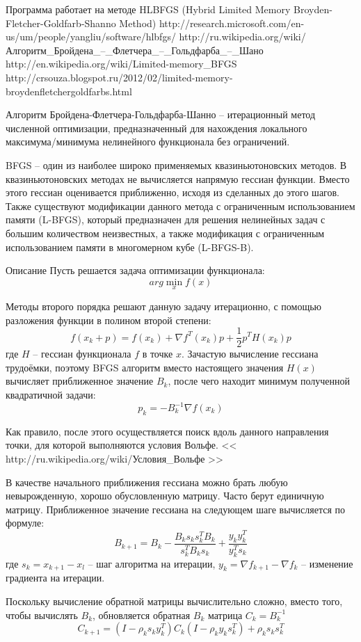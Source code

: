 Программа работает на методе HLBFGS 
(Hybrid Limited Memory Broyden-Fletcher-Goldfarb-Shanno Method)
http://research.microsoft.com/en-us/um/people/yangliu/software/hlbfgs/
http://ru.wikipedia.org/wiki/Алгоритм_Бройдена_--_Флетчера_--_Гольдфарба_--_Шано
http://en.wikipedia.org/wiki/Limited-memory_BFGS
http://crsouza.blogspot.ru/2012/02/limited-memory-broydenfletchergoldfarbs.html

Алгоритм Бройдена-Флетчера-Гольдфарба-Шанно -- итерационный метод численной 
оптимизации, предназначенный для нахождения локального максимума/минимума 
нелинейного функционала без ограничений. 

BFGS -- один из наиболее широко применяемых квазиньютоновских методов. В 
квазиньютоновских методах не вычисляется напрямую гессиан функции. Вместо этого 
гессиан оценивается приближенно, исходя из сделанных до этого шагов. Также 
существуют модификации данного метода с ограниченным использованием памяти 
(L-BFGS), который предназначен для решения нелинейных задач с большим 
количеством неизвестных, а также модификация с ограниченным использованием 
памяти в многомерном кубе (L-BFGS-B).

Описание
Пусть решается задача оптимизации функционала:
\[
    arg \min\limits_{x} f(x)
\]

Методы второго порядка решают данную задачу итерационно, с помощью разложения 
функции в полином второй степени:
\[
    f(x_k+p) = f(x_k) + \nabla f^{T}(x_k)p + \frac{1}{2}p^{T}H(x_k)p
\]
где \( H \) -- гессиан функционала \( f \) в точке \( x \). Зачастую вычисление 
гессиана трудоёмки, поэтому BFGS алгоритм вместо настоящего значения 
\( H(x) \) вычисляет приближенное значение \( B_k \), после чего находит 
минимум полученной квадратичной задачи:
\[
    p_k = -B_{k}^{-1}\nabla f(x_k)
\]

Как правило, после этого осуществляется поиск вдоль данного направления точки, 
для которой выполняются условия Вольфе.
<< http://ru.wikipedia.org/wiki/Условия_Вольфе >>

В качестве начального приближения гессиана можно брать любую невырожденную, 
хорошо обусловленную матрицу. Часто берут единичную матрицу. Приближенное 
значение гессиана на следующем шаге вычисляется по формуле:
\[
    B_{k+1} = B_k - \frac{B_k s_k s_{k}^{T} B_k}{s_{k}^{T} B_k s_k} + 
        \frac{y_k y_{k}^{T}}{y_{k}^{T} s_k}
\]
где \( s_k = x_{k+1} - x_l \) -- шаг алгоритма на итерации, 
\( y_k = \nabla f_{k+1} - \nabla f_k \) -- изменение градиента на итерации.

Поскольку вычисление обратной матрицы вычислительно сложно, вместо того, чтобы 
вычислять \( B_k \), обновляется обратная \( B_k \) матрица 
\( C_k = B_{k}^{-1} \)
\[
    C_{k+1} = \left( I - \rho_k s_k y_{k}^{T} \right)
        C_k \left( I - \rho_k y_k s_{k}^{T} \right) + \rho_k s_k s_{k}^{T}
\]

